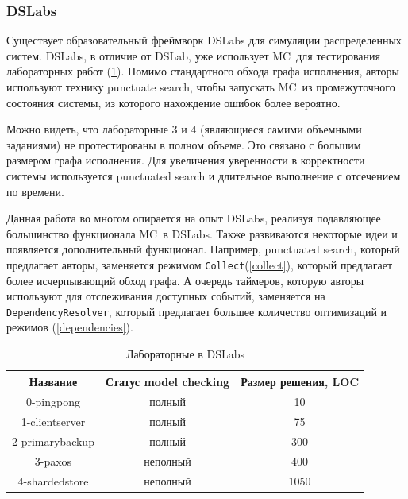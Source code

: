 \documentclass[a4paper,12pt]{extarticle}
\newcommand{\collect}[0]{\texttt{Collect}}
\newcommand{\mc}[0]{MC}
\begin{document}
\subsubsection{DSLabs}

Существует образовательный фреймворк DSLabs \cite{b1} для симуляции распределенных систем.
DSLabs, в отличие от DSLab, уже использует \mc\ для тестирования лабораторных работ (\cref{dslabsmc}).
Помимо стандартного обхода графа исполнения, авторы используют технику punctuate search, чтобы запускать \mc\ из промежуточного состояния системы, из которого нахождение ошибок более вероятно.

Можно видеть, что лабораторные 3 и 4 (являющиеся самими объемными заданиями) не протестированы в полном объеме.
Это связано с большим размером графа исполнения.
Для увеличения уверенности в корректности системы используется punctuated search и длительное выполнение с отсечением по времени. 

Данная работа во многом опирается на опыт DSLabs, реализуя подавляющее большинство функционала \mc\ в DSLabs.
Также развиваются некоторые идеи и появляется дополнительный функционал.
Например, punctuated search, который предлагает авторы, заменяется режимом \collect (\cref{collect}), который предлагает более исчерпывающий обход графа.
А очередь таймеров, которую авторы используют для отслеживания доступных событий, заменяется на \texttt{DependencyResolver}, который предлагает большее количество оптимизаций и режимов (\ref{dependencies}).

\begin{table}[htbp]
    \caption{Лабораторные в DSLabs}
    \begin{center}
    \begin{tabular}{|c|c|c|}
    \hline
    \textbf{Название} & \textbf{Статус model checking} & \textbf{Размер решения, LOC}  \\
    \hline
    0-pingpong &  полный & 10 \\
    \hline
    1-clientserver & полный & 75 \\
    \hline
    2-primarybackup & полный &  300 \\
    \hline
    3-paxos  & неполный & 400 \\
    \hline
    4-shardedstore & неполный & 1050 \\
    \hline

    \end{tabular}
    \label{dslabsmc}
    \end{center}
\end{table}
\end{document}

